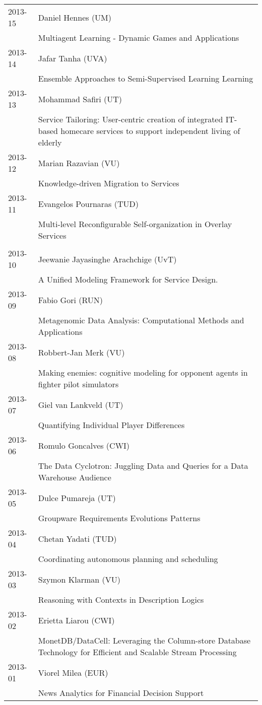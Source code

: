 \begin{longtable}{p{1.25cm}p{10.75cm}}
2013-15 & Daniel Hennes (UM) \\& Multiagent Learning - Dynamic Games and Applications \\
2013-14 & Jafar Tanha (UVA) \\& Ensemble Approaches to Semi-Supervised Learning Learning \\
2013-13 & Mohammad Safiri (UT) \\& Service Tailoring: User-centric creation of integrated IT-based homecare services to support independent living of elderly \\
2013-12 & Marian Razavian (VU) \\& Knowledge-driven Migration to Services \\
2013-11 & Evangelos Pournaras (TUD) \\& Multi-level Reconfigurable Self-organization in Overlay Services \\
\\
2013-10 & Jeewanie Jayasinghe Arachchige (UvT) \\& A Unified Modeling Framework for Service Design. \\
2013-09 & Fabio Gori (RUN) \\& Metagenomic Data Analysis: Computational Methods and Applications \\
2013-08 & Robbert-Jan Merk (VU) \\& Making enemies: cognitive modeling for opponent agents in fighter pilot simulators \\
2013-07 & Giel van Lankveld (UT) \\& Quantifying Individual Player Differences \\
2013-06 & Romulo Goncalves (CWI) \\& The Data Cyclotron: Juggling Data and Queries for a Data Warehouse \newline Audience \\
2013-05 & Dulce Pumareja (UT) \\& Groupware Requirements Evolutions Patterns \\
2013-04 & Chetan Yadati (TUD) \\& Coordinating autonomous planning and scheduling \\
2013-03 & Szymon Klarman (VU) \\& Reasoning with Contexts in Description Logics \\
2013-02 & Erietta Liarou (CWI) \\& MonetDB/DataCell: Leveraging the Column-store Database Technology for Efficient and Scalable Stream Processing \\
2013-01 & Viorel Milea (EUR) \\& News Analytics for Financial Decision Support \\
\end{longtable}

